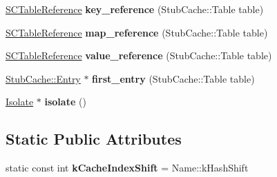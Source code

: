 \begin{DoxyCompactItemize}
\item 
\hyperlink{classv8_1_1internal_1_1_s_c_table_reference}{S\+C\+Table\+Reference} {\bfseries key\+\_\+reference} (Stub\+Cache\+::\+Table table)\hypertarget{classv8_1_1internal_1_1_stub_cache_a575962f2abed80344525523caea0f6ff}{}\label{classv8_1_1internal_1_1_stub_cache_a575962f2abed80344525523caea0f6ff}

\item 
\hyperlink{classv8_1_1internal_1_1_s_c_table_reference}{S\+C\+Table\+Reference} {\bfseries map\+\_\+reference} (Stub\+Cache\+::\+Table table)\hypertarget{classv8_1_1internal_1_1_stub_cache_a5fafa8f381e563ececf1822dc4115660}{}\label{classv8_1_1internal_1_1_stub_cache_a5fafa8f381e563ececf1822dc4115660}

\item 
\hyperlink{classv8_1_1internal_1_1_s_c_table_reference}{S\+C\+Table\+Reference} {\bfseries value\+\_\+reference} (Stub\+Cache\+::\+Table table)\hypertarget{classv8_1_1internal_1_1_stub_cache_a24b58a5748ec9e5daddb55777e945319}{}\label{classv8_1_1internal_1_1_stub_cache_a24b58a5748ec9e5daddb55777e945319}

\item 
\hyperlink{structv8_1_1internal_1_1_stub_cache_1_1_entry}{Stub\+Cache\+::\+Entry} $\ast$ {\bfseries first\+\_\+entry} (Stub\+Cache\+::\+Table table)\hypertarget{classv8_1_1internal_1_1_stub_cache_aab4c138ee8789856c0a67058107a9c58}{}\label{classv8_1_1internal_1_1_stub_cache_aab4c138ee8789856c0a67058107a9c58}

\item 
\hyperlink{classv8_1_1internal_1_1_isolate}{Isolate} $\ast$ {\bfseries isolate} ()\hypertarget{classv8_1_1internal_1_1_stub_cache_a09849599e472fa634b681bc3c2aef9af}{}\label{classv8_1_1internal_1_1_stub_cache_a09849599e472fa634b681bc3c2aef9af}

\end{DoxyCompactItemize}
\subsection*{Static Public Attributes}
\begin{DoxyCompactItemize}
\item 
static const int {\bfseries k\+Cache\+Index\+Shift} = Name\+::k\+Hash\+Shift\hypertarget{classv8_1_1internal_1_1_stub_cache_a07d471a2ba3f66c34c0dce09cb11bee8}{}\label{classv8_1_1internal_1_1_stub_cache_a07d471a2ba3f66c34c0dce09cb11bee8}

\end{DoxyCompactItemize}
